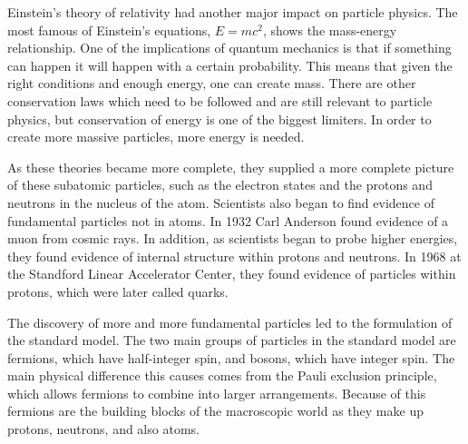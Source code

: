 Einstein's theory of relativity had another major impact on particle physics. The most famous of Einstein's equations, $E = mc^2$, shows the mass-energy relationship. One of the implications of quantum mechanics is that if something can happen it will happen with a certain probability. This means that given the right conditions and enough energy, one can create mass. There are other conservation laws which need to be followed and are still relevant to particle physics, but conservation of energy is one of the biggest limiters. In order to create more massive particles, more energy is needed. 

As these theories became more complete, they supplied a more complete picture of these subatomic particles, such as the electron states and the protons and neutrons in the nucleus of the atom. Scientists also began to find evidence of fundamental particles not in atoms. In 1932 Carl Anderson found evidence of a muon from cosmic rays. In addition, as scientists began to probe higher energies, they found evidence of internal structure within protons and neutrons. In 1968 at the Standford Linear Accelerator Center, they found evidence of particles within protons, which were later called quarks.

The discovery of more and more fundamental particles led to the formulation of the standard model. The two main groups of particles in the standard model are fermions, which have half-integer spin, and bosons, which have integer spin. The main physical difference this causes comes from the Pauli exclusion principle, which allows fermions to combine into larger arrangements. Because of this fermions are the building blocks of the macroscopic world as they make up protons, neutrons, and also atoms.   

